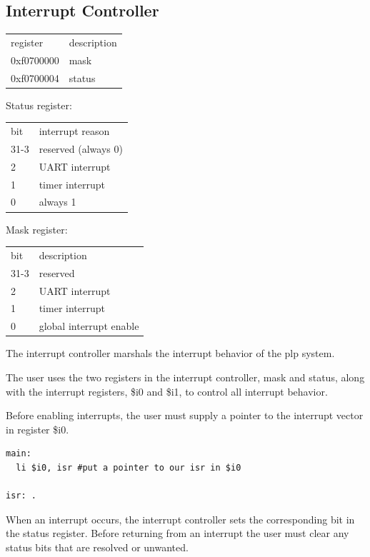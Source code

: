 \documentclass{article}
\begin{document}
\subsection{Interrupt Controller}

\begin{tabular}{ | l | l | }
\hline
register & description \\
0xf0700000 & mask \\
0xf0700004 & status \\
\hline
\end{tabular}

Status register: 

\begin{tabular}{ | l | l | }
\hline
bit & interrupt reason \\
31-3 & reserved (always 0) \\
2 & UART interrupt \\
1 & timer interrupt \\
0 & always 1 \\
\hline
\end{tabular}

Mask register: 

\begin{tabular}{ | l | l | }
\hline
bit & description \\
31-3 & reserved \\
2 & UART interrupt \\
1 & timer interrupt \\
0 & global interrupt enable \\
\hline
\end{tabular}

The interrupt controller marshals the interrupt behavior of the plp system.

The user uses the two registers in the interrupt controller, mask and status, along with the interrupt registers, \$i0 and \$i1, to control all interrupt behavior.

Before enabling interrupts, the user must supply a pointer to the interrupt vector in register \$i0. 

\begin{verbatim}
main:
  li $i0, isr #put a pointer to our isr in $i0

isr: .
\end{verbatim}
When an interrupt occurs, the interrupt controller sets the corresponding bit in the status register. Before returning from an interrupt the user must clear any status bits that are resolved or unwanted.
\end{document}
